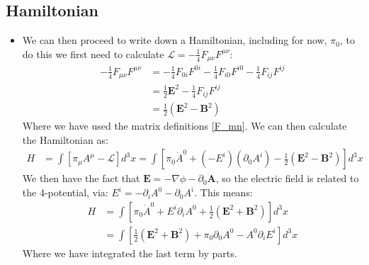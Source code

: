 \documentclass[11pt]{article}
\numberwithin{equation}{section}
\begin{document}
\subsection{Hamiltonian} %
\label{sub:hamiltonian}
\begin{itemize}
\item We can then proceed to write down a Hamiltonian, including for now, $\pi_0$, to do this we first need to calculate $\mathcal{L} = -\frac{1}{4}F_{\mu\nu}F^{\mu\nu}$:
\begin{align*}
        -\frac{1}{4}F_{\mu\nu}F^{\mu\nu} & = -\frac{1}{4}F_{0i}F^{0i}-\frac{1}{4}F_{i0}F^{i0}-\frac{1}{4}F_{ij}F^{ij} \\
        & =   \frac{1}{2}\textbf{E}^2-\frac{1}{4}F_{ij}F^{ij} \\
        & =  \frac{1}{2}\left(\textbf{E}^2-\textbf{B}^2\right)
\end{align*}
Where we have used the matrix definitions \ref{F_mn}. We can then calculate the Hamiltonian as:
\begin{align*}
         H &= \int \left[\pi_{\mu}A^{\mu} - \mathcal{L} \right]d^3x = \int \left[\pi_0\dot{A}^{0} +(-E^i)(\partial_0A^i)-\frac{1}{2}\left(\textbf{E}^2-\textbf{B}^2\right)  \right]d^3x 
\end{align*} 
We then have the fact that $\textbf{E} = -\nabla \phi -\partial_{0}\textbf{A}$, so the electric field is related to the 4-potential, via: $E^i = -\partial_{i}A^0-\partial_0A^i$. This means:
\begin{align}
\label{QED_Ham_0}
         H &= \int \left[\pi_0\dot{A}^{0} +E^i\partial_iA^0+\frac{1}{2}\left(\textbf{E}^2+\textbf{B}^2\right)  \right]d^3x \\
         \label{QED_Ham}
         & = \int \left[\frac{1}{2}\left(\textbf{E}^2+\textbf{B}^2\right)  +\pi_0\partial_0A^{0}-A^0\partial_iE^i\right]d^3x 
\end{align}
Where we have integrated the last term by parts. 
\end{itemize}
\end{document}
